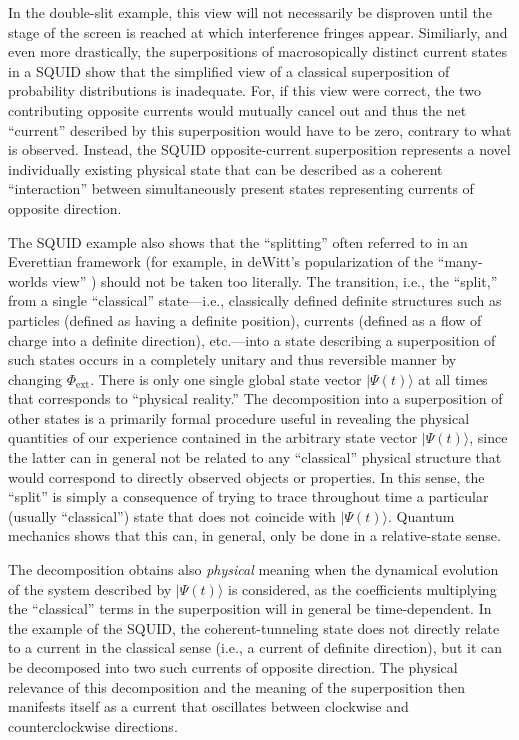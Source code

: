 \documentclass[twocolumn,aps,floatfix,amsmath,amssymb,showpacs,nofootinbib]{revtex4}
\newcommand{\ket}[1]{\ensuremath{|{#1\rangle}}}
\begin{document}
In the double-slit example, this view will not necessarily be
disproven until the stage of the screen is reached at which
interference fringes appear. Similiarly, and even more drastically,
the superpositions of macrosopically distinct current states in a
SQUID show that the simplified view of a classical superposition of
probability distributions is inadequate. For, if this view were
correct, the two contributing opposite currents would mutually cancel
out and thus the net ``current'' described by this superposition would
have to be zero, contrary to what is observed.  Instead, the SQUID
opposite-current superposition represents a novel individually
existing physical state that can be described as a coherent
``interaction'' between simultaneously present states representing
currents of opposite direction.

The SQUID example also shows that the ``splitting'' often referred to
in an Everettian framework (for example, in deWitt's popularization
of the ``many-worlds view''
\cite{DeWitt:1970:pl,DeWitt:1971:pz,DeWitt:1973:pz}) should not be
taken too literally.  The transition, i.e., the ``split,'' from a
single ``classical'' state---i.e., classically defined definite
structures such as particles (defined as having a definite position),
currents (defined as a flow of charge into a definite direction),
etc.---into a state describing a superposition of such states occurs
in a completely unitary and thus reversible manner by changing
$\Phi_\text{ext}$. There is only one single global state vector
$\ket{\Psi(t)}$ at all times that corresponds to ``physical reality.''
The decomposition into a superposition of other states is a primarily
formal procedure useful in revealing the physical quantities of
our experience contained in the arbitrary state vector
$\ket{\Psi(t)}$, since the latter can in general not be related to any
``classical'' physical structure that would correspond to directly
observed objects or properties. In this sense, the ``split'' is simply
a consequence of trying to trace throughout time a particular (usually
``classical'') state that does not coincide with $\ket{\Psi(t)}$.
Quantum mechanics shows that this can, in general, only be done in a
relative-state sense.

The decomposition obtains also {\em physical} meaning when the
dynamical evolution of the system described by $\ket{\Psi(t)}$ is
considered, as the coefficients multiplying the ``classical'' terms in
the superposition will in general be time-dependent. In the example of
the SQUID, the coherent-tunneling state does not directly relate to a
current in the classical sense (i.e., a current of definite
direction), but it can be decomposed into two such currents of
opposite direction. The physical relevance of this decomposition and
the meaning of the superposition then manifests itself as a current
that oscillates between clockwise and counterclockwise directions.
\end{document}
